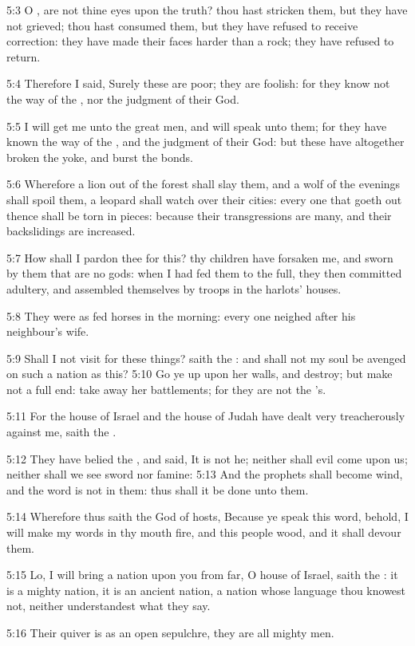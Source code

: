 5:3 O \LORD, are not thine eyes upon the truth? thou hast stricken them, but they have not grieved; thou hast consumed them, but they have refused to receive correction: they have made their faces harder than a rock; they have refused to return.

5:4 Therefore I said, Surely these are poor; they are foolish: for they know not the way of the \LORD, nor the judgment of their God.

5:5 I will get me unto the great men, and will speak unto them; for they have known the way of the \LORD, and the judgment of their God: but these have altogether broken the yoke, and burst the bonds.

5:6 Wherefore a lion out of the forest shall slay them, and a wolf of the evenings shall spoil them, a leopard shall watch over their cities: every one that goeth out thence shall be torn in pieces: because their transgressions are many, and their backslidings are increased.

5:7 How shall I pardon thee for this? thy children have forsaken me, and sworn by them that are no gods: when I had fed them to the full, they then committed adultery, and assembled themselves by troops in the harlots' houses.

5:8 They were as fed horses in the morning: every one neighed after his neighbour's wife.

5:9 Shall I not visit for these things? saith the \LORD: and shall not my soul be avenged on such a nation as this?  5:10 Go ye up upon her walls, and destroy; but make not a full end: take away her battlements; for they are not the \LORD's.

5:11 For the house of Israel and the house of Judah have dealt very treacherously against me, saith the \LORD.

5:12 They have belied the \LORD, and said, It is not he; neither shall evil come upon us; neither shall we see sword nor famine: 5:13 And the prophets shall become wind, and the word is not in them: thus shall it be done unto them.

5:14 Wherefore thus saith the \LORD God of hosts, Because ye speak this word, behold, I will make my words in thy mouth fire, and this people wood, and it shall devour them.

5:15 Lo, I will bring a nation upon you from far, O house of Israel, saith the \LORD: it is a mighty nation, it is an ancient nation, a nation whose language thou knowest not, neither understandest what they say.

5:16 Their quiver is as an open sepulchre, they are all mighty men.

